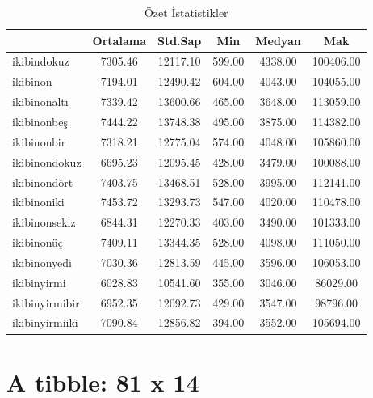 \documentclass[
  12pt,
]{article}
\begin{document}
\begin{table}[ht]
\centering
\caption{Özet İstatistikler} 
\label{tab:ozet}
\begin{tabular}{lccccc}
  \toprule
 & Ortalama & Std.Sap & Min & Medyan & Mak \\ 
  \midrule
ikibindokuz & 7305.46 & 12117.10 & 599.00 & 4338.00 & 100406.00 \\ 
  ikibinon & 7194.01 & 12490.42 & 604.00 & 4043.00 & 104055.00 \\ 
  ikibinonaltı & 7339.42 & 13600.66 & 465.00 & 3648.00 & 113059.00 \\ 
  ikibinonbeş & 7444.22 & 13748.38 & 495.00 & 3875.00 & 114382.00 \\ 
  ikibinonbir & 7318.21 & 12775.04 & 574.00 & 4048.00 & 105860.00 \\ 
  ikibinondokuz & 6695.23 & 12095.45 & 428.00 & 3479.00 & 100088.00 \\ 
  ikibinondört & 7403.75 & 13468.51 & 528.00 & 3995.00 & 112141.00 \\ 
  ikibinoniki & 7453.72 & 13293.73 & 547.00 & 4020.00 & 110478.00 \\ 
  ikibinonsekiz & 6844.31 & 12270.33 & 403.00 & 3490.00 & 101333.00 \\ 
  ikibinonüç & 7409.11 & 13344.35 & 528.00 & 4098.00 & 111050.00 \\ 
  ikibinonyedi & 7030.36 & 12813.59 & 445.00 & 3596.00 & 106053.00 \\ 
  ikibinyirmi & 6028.83 & 10541.60 & 355.00 & 3046.00 & 86029.00 \\ 
  ikibinyirmibir & 6952.35 & 12092.73 & 429.00 & 3547.00 & 98796.00 \\ 
  ikibinyirmiiki & 7090.84 & 12856.82 & 394.00 & 3552.00 & 105694.00 \\ 
   \bottomrule
\end{tabular}
\end{table}

\hypertarget{a-tibble-81-x-14}{%
\section{A tibble: 81 x 14}\label{a-tibble-81-x-14}}
\end{document}
